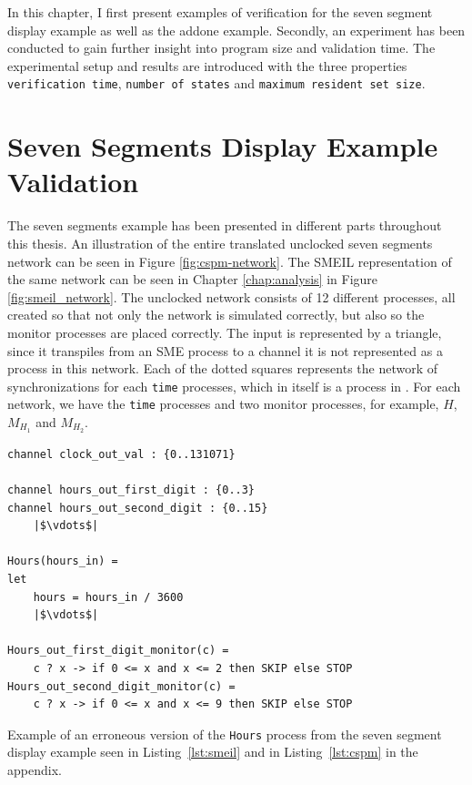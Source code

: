 
In this chapter, I first present examples of verification for the seven segment display example as well as the addone example. Secondly, an experiment has been conducted to gain further insight into program size and validation time. The experimental setup and results are introduced with the three properties \texttt{verification time}, \texttt{number of states} and \texttt{maximum resident set size}.

\section{Seven Segments Display Example Validation}
The seven segments example has been presented in different parts throughout this thesis. An illustration of the entire translated unclocked seven segments network can be seen in Figure \ref{fig:cspm-network}. The SMEIL representation of the same network can be seen in Chapter \ref{chap:analysis} in Figure \ref{fig:smeil_network}.
The unclocked \cspm{} network consists of 12 different processes, all created so that not only the network is simulated correctly, but also so the monitor processes are placed correctly. The input is represented by a triangle, since it transpiles from an SME process to a \cspm{} channel it  is not represented as a process in this network. Each of the dotted squares represents the network of synchronizations for each \texttt{time} processes, which in itself is a process in \cspm{}. For each network, we have the \texttt{time} processes and two monitor processes, for example, $H$, $M_{H_1}$ and $M_{H_2}$.
\\

\begin{listing}
\begin{verbatim}
channel clock_out_val : {0..131071}

channel hours_out_first_digit : {0..3}
channel hours_out_second_digit : {0..15}
    |$\vdots$|

Hours(hours_in) =
let
    hours = hours_in / 3600
    |$\vdots$|

Hours_out_first_digit_monitor(c) =
    c ? x -> if 0 <= x and x <= 2 then SKIP else STOP
Hours_out_second_digit_monitor(c) =
    c ? x -> if 0 <= x and x <= 9 then SKIP else STOP

\end{verbatim}
\caption{Example of an erroneous version of the \texttt{Hours} process from the \cspm{} seven segment display example seen in Listing~\ref{lst:smeil} and in Listing~\ref{lst:cspm} in the appendix.}
\label{lst:cspm_error}
\end{listing}


